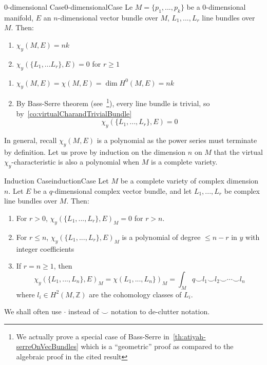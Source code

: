\documentclass{book}
\newcommand{\Z}{{\mathbb{Z}}}
\begin{document}
\begin{lem}{0-dimensional Case}{0-dimensionalCase}
  Le $M = \{p_1, ..., p_k\}$ be a $0$-dimensional manifold, $E$ an $n$-dimensional vector bundle over $M$, $L_1, ..., L_r$ line
  bundles over $M$. Then:
  \begin{enumerate}
    \item $\chi_y(M, E) = nk$
  \item $\chi_y(\{L_1, ... L_r\}, E) = 0$ for $r \ge 1$
  \end{enumerate}
\end{lem}

\begin{Proof}
  \begin{enumerate}
    \item $\chi_y(M, E) = \chi(M,E) = \dim H^0(M, E) = nk$
    \item By Bass-Serre theorem (see~\cite{NateKTheory}\footnote{We actually prove a special case of
      Bass-Serre in~\cref{th:atiyah-serreOnVecBundles} which is a ``geometric'' proof as compared to the
    algebraic proof in the cited result}), every line bundle is trivial, so by~\cref{co:virtualCharandTrivialBundle}
    \[
      \chi_y(\{L_1, ..., L_r\}, E) = 0
    \]
  \end{enumerate}
\end{Proof}


In general, recall $\chi_y(M,E)$ is a polynomial as the power series must terminate by definition. Let us prove by
induction on the dimension $n$ on $M$ that the virtual $\chi_y$-characteristic is also a polynomial when $M$
is a complete variety.


\begin{thm}{Induction Case}{inductionCase}
  Let $M$ be a complete variety of complex dimension $n$. Let $E$ be a $q$-dimensional complex vector
  bundle, and let $L_1, ..., L_r$ be complex line bundles over $M$. Then:
  \begin{enumerate}
    \item For $r > 0$, $\chi_y(\{L_1, ..., L_r\}, E)_M = 0$ for $r > n$.
    \item For $r \le n$, $\chi_y(\{L_1, ..., L_r\}, E)_M$ is a polynomial of degree $\le n-r$ in $y$ with
      integer coefficients
     \item If $r = n \ge 1$, then
       \[
       \chi_y(\{L_1, ..., L_n\}, E)_M = \chi(L_1, ..., L_n\})_M = \int_M q\smile l_1\smile l_2\smile \cdots \smile
       l_n
       \]
       where $l_i \in H^2(M, \Z)$ are the cohomology classes of $L_i$.
  \end{enumerate}
\end{thm}
We shall often use $\cdot$ instead of $\smile$ notation to de-clutter notation.
\end{document}
